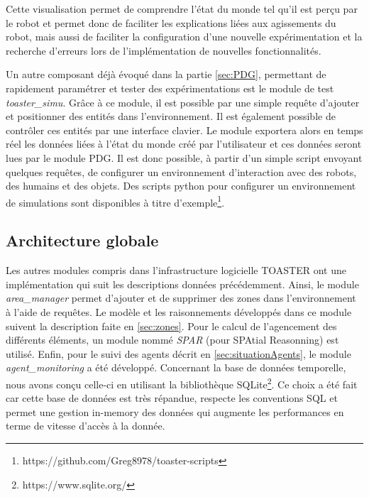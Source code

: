 \documentclass[a4paper,11pt,twoside]{StyleThese}
\begin{document}
Cette visualisation permet de comprendre l'état du monde tel qu'il est perçu par le robot et permet donc de faciliter les explications liées aux agissements du robot, mais aussi de faciliter la configuration d'une nouvelle expérimentation et la recherche d'erreurs lors de l'implémentation de nouvelles fonctionnalités. 


Un autre composant déjà évoqué dans la partie \ref{sec:PDG}, permettant de rapidement paramétrer et tester des expérimentations est le module de test \textit{toaster\_simu}. Grâce à ce module, il est possible par une simple requête d'ajouter et positionner des entités dans l'environnement. Il est également possible de contrôler ces entités par une interface clavier. Le module exportera alors en temps réel les données liées à l'état du monde créé par l'utilisateur et ces données seront lues par le module PDG. Il est donc possible, à partir d'un simple script envoyant quelques requêtes, de configurer un environnement d'interaction avec des robots, des humains et des objets. Des scripts python pour configurer un environnement de simulations sont disponibles à titre d'exemple\footnote{https://github.com/Greg8978/toaster-scripts}.


\subsection{Architecture globale}
Les autres modules compris dans l'infrastructure logicielle TOASTER ont une implémentation qui suit les descriptions données précédemment.
Ainsi, le module \textit{area\_manager} permet d'ajouter et de supprimer des zones dans l'environnement à l'aide de requêtes. Le modèle et les raisonnements développés dans ce module suivent la description faite en \ref{sec:zones}. Pour le calcul de l'agencement des différents éléments, un module nommé \textit{SPAR} (pour SPAtial Reasonning) est utilisé. Enfin, pour le suivi des agents décrit en \ref{sec:situationAgents}, le module \textit{agent\_monitoring} a été développé.
Concernant la base de données temporelle, nous avons conçu celle-ci en utilisant la bibliothèque SQLite\footnote{https://www.sqlite.org/}. Ce choix a été fait car cette base de données est très répandue, respecte les conventions SQL et permet une gestion in-memory des données qui augmente les performances en terme de vitesse d'accès à la donnée.
\end{document}
